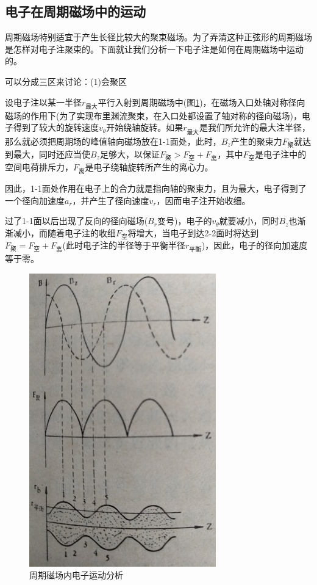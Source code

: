 \subsection{电子在周期磁场中的运动}


周期磁场特别适宜于产生长径比较大的聚束磁场。为了弄清这种正弦形的周期磁场是怎样对电子注聚束的。下面就让我们分析一下电子注是如何在周期磁场中运动的。


可以分成三区来讨论：(1)会聚区


设电子注以某一半径$ r_{\textrm{最大}} $平行入射到周期磁场中(图\ref{ch7-19})，在磁场入口处轴对称径向磁场的作用下(为了实现布里渊流聚束，在入口处都设置了轴对称的径向磁场)，电子得到了较大的旋转速度$ v_\theta $开始绕轴旋转。如果$ r_{\textrm{最大}} $是我们所允许的最大注半径，那么就必须把周期场的峰值轴向磁场放在1-1面处，此时，$ B_z $产生的聚束力$ F_{\textrm{聚}} $就达到最大，同时还应当使$ B_z $足够大，以保证$ F_{\textrm{聚}} >  F_{\textrm{空}} +  F_{\textrm{离}}  $，其中$ F_{\textrm{空}} $是电子注中的空间电荷排斥力，$ F_{\textrm{离}} $是电子绕轴旋转所产生的离心力。


因此，1-1面处作用在电子上的合力就是指向轴的聚束力，且为最大，电子得到了一个径向加速度$ a_r $，并产生了径向速度$ v_r $，因而电子注开始收细。


过了1-1面以后出现了反向的径向磁场($ B_r $变号)，电子的$ v_\theta $就要减小，同时$ B_z $也渐渐减小，而随着电子注的收细$ F_{\textrm{空}} $将增大，当电子到达2-2面时将达到$ F_{\textrm{聚}} =  F_{\textrm{空}} +  F_{\textrm{离}}  $(此时电子注的半径等于平衡半径$ r_{\textrm{平衡}} $)，因此，电子的径向加速度等于零。
\begin{figure}[phtb]
	\centering
	\includegraphics[width=0.37\linewidth]{figure/ch7-19}
	\caption{周期磁场内电子运动分析}
	\label{ch7-19}
\end{figure}

